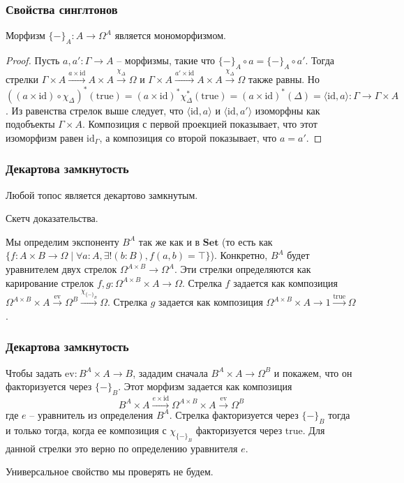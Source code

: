 \documentclass{beamer}
\theoremstyle{definition}
\newcommand{\cat}[1]{\mathbf{#1}}
\newcommand{\Set}{\cat{Set}}
\newcommand{\fs}[1]{\mathrm{#1}}
\newcommand{\id}{\fs{id}}
\newcommand{\ev}{\fs{ev}}
\begin{document}
\begin{frame}
\frametitle{Свойства синглтонов}
\begin{prop}
Морфизм $\{-\}_A : A \to \Omega^A$ является мономорфизмом.
\end{prop}
\begin{proof}
Пусть $a,a' : \Gamma \to A$ -- морфизмы, такие что $\{-\}_A \circ a = \{-\}_A \circ a'$.
Тогда стрелки $\Gamma \times A \xrightarrow{a \times \id} A \times A \xrightarrow{\chi_\Delta} \Omega$ и $\Gamma \times A \xrightarrow{a' \times \id} A \times A \xrightarrow{\chi_\Delta} \Omega$ также равны.
Но $((a \times \id) \circ \chi_\Delta)^*(\fs{true}) = (a \times \id)^* \chi_\Delta^*(\fs{true}) = (a \times \id)^* (\Delta) = \langle \id, a \rangle : \Gamma \to \Gamma \times A$.
Из равенства стрелок выше следует, что $\langle \id, a \rangle$ и $\langle \id, a' \rangle$ изоморфны как подобъекты $\Gamma \times A$.
Композиция с первой проекцией показывает, что этот изоморфизм равен $\id_\Gamma$, а композиция со второй показывает, что $a = a'$.
\end{proof}
\end{frame}

\begin{frame}
\frametitle{Декартова замкнутость}
\begin{prop}
Любой топос является декартово замкнутым.
\end{prop}
Скетч доказательства.

Мы определим экспоненту $B^A$ так же как и в $\Set$ (то есть как $\{ f : A \times B \to \Omega \mid \forall a : A, \exists! (b : B), f(a,b) = \top \}$).
Конкретно, $B^A$ будет уравнителем двух стрелок $\Omega^{A \times B} \to \Omega^A$.
Эти стрелки определяются как карирование стрелок $f,g : \Omega^{A \times B} \times A \to \Omega$.
Стрелка $f$ задается как композиция $\Omega^{A \times B} \times A \xrightarrow{\fs{ev}} \Omega^B \xrightarrow{\chi_{\{-\}_B}} \Omega$.
Стрелка $g$ задается как композиция $\Omega^{A \times B} \times A \to 1 \xrightarrow{\fs{true}} \Omega$.
\end{frame}

\begin{frame}
\frametitle{Декартова замкнутость}
Чтобы задать $\ev : B^A \times A \to B$, зададим сначала $B^A \times A \to \Omega^B$ и покажем, что он факторизуется через $\{-\}_B$.
Этот морфизм задается как композиция
\[ B^A \times A \xrightarrow{e \times \id} \Omega^{A \times B} \times A \xrightarrow{\fs{ev}} \Omega^B \]
где $e$ -- уравнитель из определения $B^A$.
Стрелка факторизуется через $\{-\}_B$ тогда и только тогда, когда ее композиция с $\chi_{\{-\}_B}$ факторизуется через $\fs{true}$.
Для данной стрелки это верно по определению уравнителя $e$.

Универсальное свойство мы проверять не будем.
\end{frame}
\end{document}
